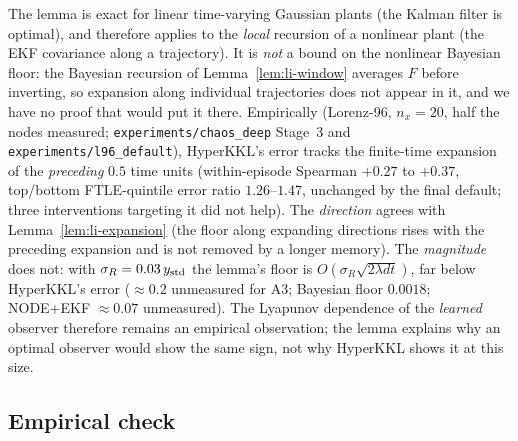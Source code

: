 \begin{remark}\label{rem:li-scope}
The lemma is exact for linear time-varying Gaussian plants (the Kalman filter is optimal), and therefore applies to
the \emph{local} recursion of a nonlinear plant (the EKF covariance along a trajectory). It is \emph{not} a bound on
the nonlinear Bayesian floor: the Bayesian recursion of Lemma~\ref{lem:li-window} averages $F$ before inverting, so
expansion along individual trajectories does not appear in it, and we have no proof that would put it there.
Empirically (Lorenz-96, $n_x=20$, half the nodes measured; \texttt{experiments/chaos\_deep} Stage~3 and
\texttt{experiments/l96\_default}), HyperKKL's error tracks the finite-time expansion of the \emph{preceding}
$0.5$ time units (within-episode Spearman $+0.27$ to $+0.37$, top/bottom FTLE-quintile error ratio $1.26$--$1.47$,
unchanged by the final default; three interventions targeting it did not help). The \emph{direction} agrees with
Lemma~\ref{lem:li-expansion} (the floor along expanding directions rises with the preceding expansion and is not
removed by a longer memory). The \emph{magnitude} does not: with $\sigma_R=0.03\,y_{\rm std}$ the lemma's floor is
$O(\sigma_R\sqrt{2\lambda dt})$, far below HyperKKL's error ($\approx0.2$ unmeasured for A3; Bayesian floor $0.0018$;
NODE+EKF $\approx0.07$ unmeasured). The Lyapunov dependence of the \emph{learned} observer therefore remains an empirical observation; the
lemma explains why an optimal observer would show the same sign, not why HyperKKL shows it at this size.
\end{remark}

\subsection{Empirical check}

